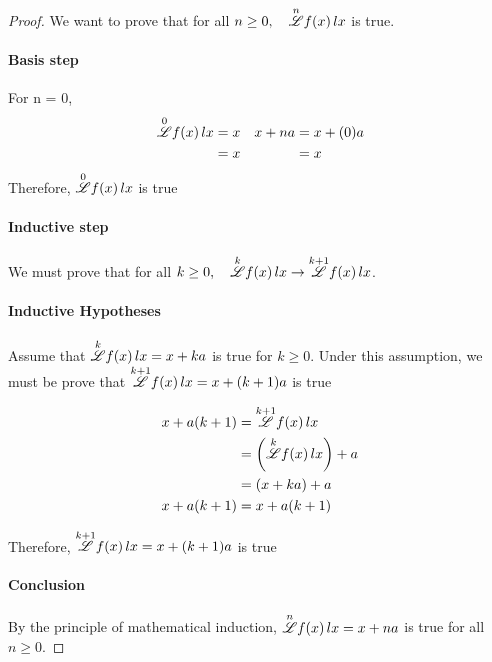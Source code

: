 \documentclass[12pt, letterpaper]{article}
\begin{document}
\begin{proof}
    We want to prove that for all $n \ge 0, \quad \overset{n}{\mathscr{L}} f(x) \, lx$  is true.

    \paragraph{Basis step}
    For n = 0, 
    \begin{align*}
        \overset{0}{\mathscr{L}} f(x) \, lx &= x &
        x + na &= x + (0)a \\
        &= x &&= x 
    \end{align*}
    Therefore, $\overset{0}{\mathscr{L}} f(x) \, lx$ is true

    \paragraph{Inductive step}

    We must prove that for all $k \ge 0, \quad \overset{k}{\mathscr{L}} f(x) \, lx \to \overset{k+1}{\mathscr{L}} f(x) \, lx$.

    \paragraph{Inductive Hypotheses}
    Assume that $\overset{k}{\mathscr{L}} f(x) \, lx = x + ka$ is true for $k \ge 0$.
    Under this assumption, we must be prove that $\overset{k+1}{\mathscr{L}} f(x) \, lx = x + (k+1)a $ is true

    \begin{align*}
        x + a(k+1) &= \overset{k+1}{\mathscr{L}} f(x) \, lx \\ 
        &= \left(\overset{k}{\mathscr{L}} f(x) \, lx \right) + a \\ 
        &= \left(x + ka\right) + a \\ 
        x + a(k+1) &= x + a(k + 1) \\ 
    \end{align*}

    Therefore, $\overset{k+1}{\mathscr{L}} f(x) \, lx = x + (k+1)a $ is true 

    \paragraph{Conclusion} By the principle of mathematical induction, $\overset{n}{\mathscr{L}} f(x) \, lx = x+na$ is true for all $n \ge 0$.
    
\end{proof}
\end{document}
